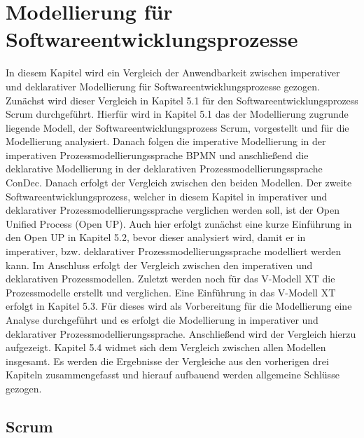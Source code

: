\chapter{Modellierung für Softwareentwicklungsprozesse}\label{sec:chapter6}
In diesem Kapitel wird ein Vergleich der Anwendbarkeit zwischen imperativer und deklarativer Modellierung für Softwareentwicklungsprozesse gezogen. Zunächst  wird dieser Vergleich in Kapitel 5.1 für den Softwareentwicklungsprozess Scrum durchgeführt. Hierfür wird in Kapitel 5.1 das der Modellierung zugrunde liegende Modell, der Softwareentwicklungsprozess Scrum, vorgestellt und für die Modellierung analysiert. Danach folgen die imperative Modellierung in der imperativen Prozessmodellierungssprache BPMN und anschließend die deklarative Modellierung in der deklarativen Prozessmodellierungssprache ConDec. Danach erfolgt der Vergleich zwischen den beiden Modellen.\newline
Der zweite Softwareentwicklungsprozess, welcher in diesem Kapitel in imperativer und deklarativer Prozessmodellierungssprache verglichen werden soll, ist der Open Unified Process (Open UP). Auch hier erfolgt zunächst eine kurze Einführung in den Open UP in Kapitel 5.2, bevor dieser analysiert wird, damit er in imperativer, bzw. deklarativer Prozessmodellierungssprache modelliert werden kann. Im Anschluss erfolgt der Vergleich zwischen den imperativen und deklarativen Prozessmodellen.\newline
Zuletzt werden noch für das V-Modell XT die Prozessmodelle erstellt und verglichen. Eine Einführung in das V-Modell XT erfolgt in Kapitel 5.3. Für dieses wird als Vorbereitung für die Modellierung eine Analyse durchgeführt und es erfolgt die Modellierung in imperativer und deklarativer Prozessmodellierungssprache. Anschließend wird der Vergleich hierzu aufgezeigt.\newline
Kapitel 5.4 widmet sich dem Vergleich zwischen allen Modellen insgesamt. Es werden die Ergebnisse der Vergleiche aus den vorherigen drei Kapiteln zusammengefasst und hierauf aufbauend werden allgemeine Schlüsse gezogen.\newline


\section{Scrum}\label{sec:chapter6:Imperative Modellierung}

